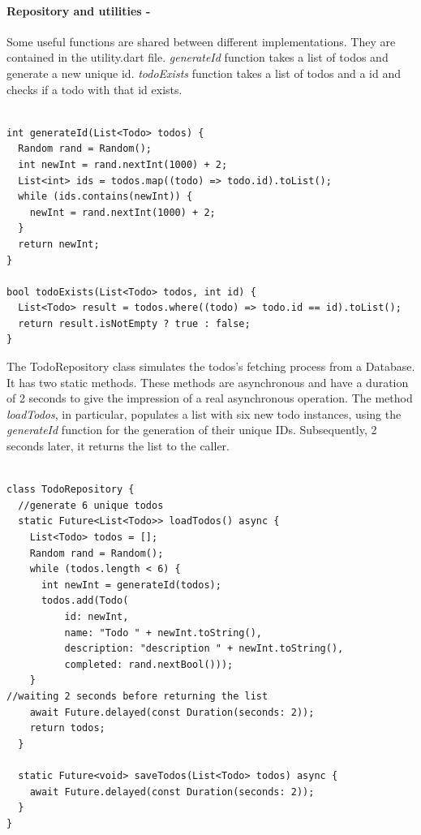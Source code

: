 \paragraph{Repository and utilities - }
	\label{par:todo_app_models_and_repository}
Some useful functions are shared between different implementations. They are contained in the utility.dart file. \textit{generateId} function takes a list of todos and generate a new unique id. \textit{todoExists} function takes a list of todos and a id and checks if a todo with that id exists.
\mbox{}\\
\begin{code}
			\label{code:2.5}
	\begin{verbatim}
	
int generateId(List<Todo> todos) {
  Random rand = Random();
  int newInt = rand.nextInt(1000) + 2;
  List<int> ids = todos.map((todo) => todo.id).toList();
  while (ids.contains(newInt)) {
    newInt = rand.nextInt(1000) + 2;
  }
  return newInt;
}

bool todoExists(List<Todo> todos, int id) {
  List<Todo> result = todos.where((todo) => todo.id == id).toList();
  return result.isNotEmpty ? true : false;
}
	\end{verbatim}
	\end{code}
The TodoRepository class simulates the todos's fetching process from a Database. It has two static methods. These methods are asynchronous and have a duration of 2 seconds to give the impression of a real asynchronous operation. The method \textit{loadTodos}, in particular, populates a list with six new todo instances, using the \textit{generateId} function for the generation of their unique IDs. Subsequently, 2 seconds later, it returns the list to the caller.
	\mbox{}\\
	\begin{code}
			\label{code:2.6}
	\begin{verbatim}
	
class TodoRepository {
  //generate 6 unique todos
  static Future<List<Todo>> loadTodos() async {
    List<Todo> todos = [];
    Random rand = Random();
    while (todos.length < 6) {
      int newInt = generateId(todos);
      todos.add(Todo(
          id: newInt,
          name: "Todo " + newInt.toString(),
          description: "description " + newInt.toString(),
          completed: rand.nextBool()));
    }
//waiting 2 seconds before returning the list
    await Future.delayed(const Duration(seconds: 2));
    return todos;
  }

  static Future<void> saveTodos(List<Todo> todos) async {
    await Future.delayed(const Duration(seconds: 2));
  }
}
	\end{verbatim}
	\end{code}
	
